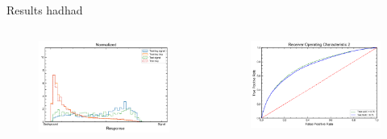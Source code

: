\begin{frame}{Results hadhad}
\begin{columns}
  \begin{column}{0.5\textwidth}
    \begin{figure}
      \includegraphics[width=\textwidth]{response_hadhad.png}
    \end{figure}
  \end{column}
  \begin{column}{0.5\textwidth}
    \begin{figure}
      \includegraphics[width=\textwidth]{ROC_hadhad.png}
    \end{figure}
  \end{column}
\end{columns}
\end{frame}
